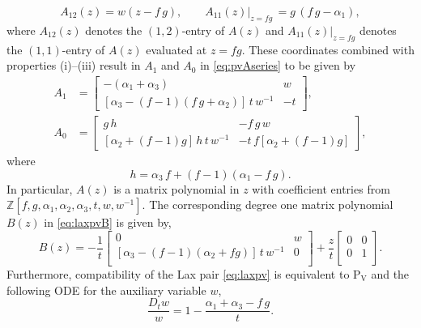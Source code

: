 \documentclass[a4paper,reqno]{amsart}
\numberwithin{equation}{section}
\numberwithin{figure}{section}
\theoremstyle{remark}
\newcommand\Pfive{\textrm{P}_{\textrm{V}}}
\begin{document}
\begin{equation*}
    A_{12}(z)=w(z-f\,g),\qquad A_{11}(z)|_{z=fg}\,=g\,(f\,g-\alpha_1),
\end{equation*}
where $A_{12}(z)$ denotes the $(1,2)$-entry of $A(z)$ and $A_{11}(z)|_{z=fg}$ denotes the $(1,1)$-entry of $A(z)$ evaluated at $z=fg$. 
These coordinates combined with properties (i)--(iii) result in $A_1$ and $A_0$ in \eqref{eq:pvAseries} to be given by
\begin{align*}
A_1&=\begin{bmatrix}
 -(\alpha_1+\alpha_3) & w\\
 [\alpha_3-(f-1)(f\,g+\alpha_2)]\,t\,w^{-1} & -t
\end{bmatrix},\\
A_0&=\begin{bmatrix}
g\, h & -f\, g\, w\\
[\alpha_2+(f-1)g]\,h\,t\,w^{-1} & -t\,f[\alpha_2+(f-1)g]
\end{bmatrix},
\end{align*}
where
\begin{equation*}
    h=\alpha_3\, f+(f-1)(\alpha_1-f\,g).
\end{equation*}
In particular, $A(z)$ is a matrix polynomial in $z$ with coefficient entries from $\mathbb{Z}[f,g,\alpha_1,\alpha_2,\alpha_3,t,w,w^{-1}]$. The corresponding degree one matrix polynomial $B(z)$ in \eqref{eq:laxpvB} is given by,
\begin{equation*}
    B(z)=-\frac{1}{t}\begin{bmatrix}
 0 & w \\
 [\alpha_3-(f-1)(\alpha_2+f g)]\,t\,w^{-1} & 0 \\
\end{bmatrix}+\frac{z}{t}\begin{bmatrix}
 0 & 0 \\
 0 & 1\\
\end{bmatrix}.
\end{equation*}
Furthermore, compatibility of the Lax pair \eqref{eq:laxpv} is equivalent to $\Pfive$ and the following ODE for the auxiliary variable $w$,
\begin{equation*}
    \frac{D_tw}{w}=1-\frac{\alpha_1+\alpha_3-f\,g}{t}.
\end{equation*}
\end{document}
